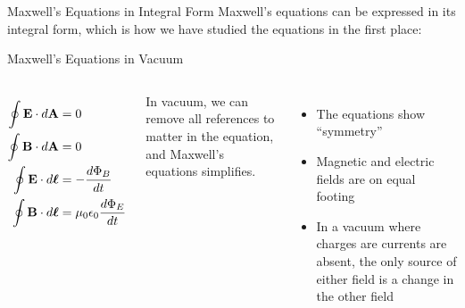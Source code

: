 \documentclass[12pt,aspectratio=169]{beamer}
\begin{document}
\begin{frame}{Maxwell's Equations in Integral Form}
  Maxwell's equations can be expressed in its integral form, which is how we
  have studied the equations in the first place:

\end{frame}



\begin{frame}{Maxwell's Equations in Vacuum}
  \begin{columns}
    
    {\Large
      \begin{align*}
        \oint\mathbf{E}\cdot d\mathbf{A} &= 0 \\
        \oint\mathbf{B}\cdot d\mathbf{A} &= 0 \\
        \oint\mathbf{E}\cdot d\boldsymbol{\ell}&=-\frac{d\Phi_B}{dt} \\
        \oint\mathbf{B}\cdot d\boldsymbol{\ell}&=\mu_0\epsilon_0\frac{d\Phi_E}{dt}\\
      \end{align*}
    }

    In vacuum, we can remove all references to matter in the equation, and
    Maxwell's equations simplifies.
    \begin{itemize}
    \item The equations show ``symmetry''
    \item Magnetic and electric fields are on equal footing
    \item In a vacuum where charges are currents are absent, the only source of
      either field is a change in the other field
    \end{itemize}
  \end{columns}
\end{frame}
\end{document}
